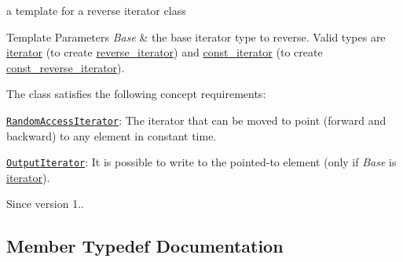 a template for a reverse iterator class 


\begin{DoxyTemplParams}{Template Parameters}
{\em Base} & the base iterator type to reverse. Valid types are \hyperlink{classnlohmann_1_1basic__json_a099316232c76c034030a38faa6e34dca}{iterator} (to create \hyperlink{classnlohmann_1_1basic__json_ac223d5560c2b05a208c88de67376c5f2}{reverse\+\_\+iterator}) and \hyperlink{classnlohmann_1_1basic__json_a41a70cf9993951836d129bb1c2b3126a}{const\+\_\+iterator} (to create \hyperlink{classnlohmann_1_1basic__json_a72be3c24bfa24f0993d6c11af03e7404}{const\+\_\+reverse\+\_\+iterator}).\\
\hline
\end{DoxyTemplParams}
The class satisfies the following concept requirements\+:
\begin{DoxyItemize}
\item \href{http://en.cppreference.com/w/cpp/concept/RandomAccessIterator}{\tt Random\+Access\+Iterator}\+: The iterator that can be moved to point (forward and backward) to any element in constant time.
\item \href{http://en.cppreference.com/w/cpp/concept/OutputIterator}{\tt Output\+Iterator}\+: It is possible to write to the pointed-\/to element (only if {\itshape Base} is \hyperlink{classnlohmann_1_1basic__json_a099316232c76c034030a38faa6e34dca}{iterator}).
\end{DoxyItemize}

\begin{DoxySince}{Since}
version 1.. 
\end{DoxySince}


\subsection{Member Typedef Documentation}
\mbox{\label{classnlohmann_1_1basic__json_1_1json__reverse__iterator_a5b7f3c5d86fe89a65d9552c1cac37261}} 
